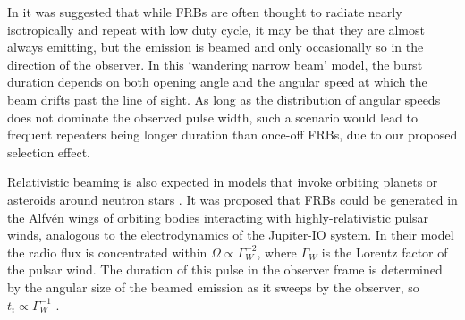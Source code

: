 \documentclass[fleqn,usenatbib]{mnras}
\begin{document}
In \citet{katz-2017} it was suggested that while FRBs are often thought 
to radiate nearly isotropically and repeat with low duty cycle, 
it may be that they are almost always emitting, but the emission 
is beamed and only occasionally so in the direction of the observer. 
In this `wandering narrow beam' model, the burst duration 
depends on both opening angle and the angular speed at which 
the beam drifts past the line of sight. As long as the distribution 
of angular speeds does not dominate the observed pulse width, 
such a scenario would lead to frequent repeaters being longer 
duration than once-off FRBs, due to our proposed selection 
effect.

Relativistic beaming is 
also expected in models that invoke orbiting planets 
or asteroids around neutron stars \citep{mottez-zarka-2015, mottez-2020}. 
It was proposed 
that FRBs could be generated in the Alfv\'{e}n wings of orbiting bodies 
interacting with highly-relativistic pulsar winds, 
analogous to the electrodynamics of the Jupiter-IO system. 
In their model the radio flux is concentrated within 
$\Omega\propto\Gamma^{-2}_W$, where $\Gamma_W$ is the 
Lorentz factor of the pulsar wind. The duration of this pulse 
in the observer frame is determined by the angular size of the beamed emission as it sweeps by the observer, so 
$t_i\propto\Gamma_W^{-1}$ \citep{mottez-2020}. 


\end{document}
